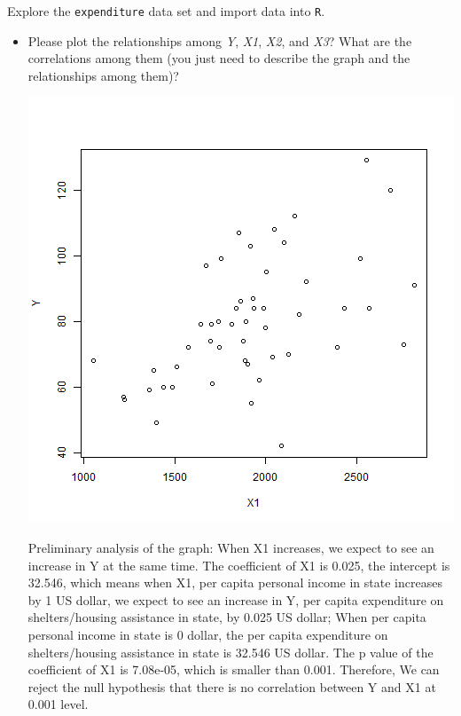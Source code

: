 \documentclass[12pt,letterpaper]{article}
\begin{document}
\vspace{.5cm}
\noindent Explore the \texttt{expenditure} data set and import data into \texttt{R}.
\vspace{.5cm}
  
\vspace{.5cm}
\begin{itemize}

\item
Please plot the relationships among \emph{Y}, \emph{X1}, \emph{X2}, and \emph{X3}? What are the correlations among them (you just need to describe the graph and the relationships among them)?

 

\includegraphics[scale=.80]{Y ~ X1.png}

Preliminary analysis of the graph: When X1 increases, we expect to see an increase in Y at the same time.
The coefficient of X1 is 0.025, the intercept is 32.546, which means when X1, per capita personal income in state increases by 1 US dollar, we expect to see an increase in Y, per capita expenditure on shelters/housing assistance in state, by 0.025 US dollar; When per capita personal income in state is 0 dollar, the per capita expenditure on shelters/housing assistance in state is 32.546 US dollar.
The p value of the coefficient of X1 is 7.08e-05, which is smaller than 0.001. Therefore, We can reject the null hypothesis that there is no correlation between Y and X1 at 0.001 level.




\end{itemize}
\end{document}
